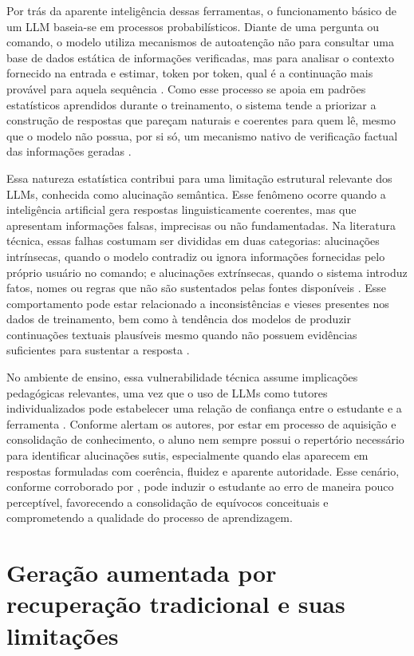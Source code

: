 Por trás da aparente inteligência dessas ferramentas, o funcionamento básico de um LLM baseia-se em processos probabilísticos. Diante de uma pergunta ou comando, o modelo utiliza mecanismos de autoatenção não para consultar uma base de dados estática de informações verificadas, mas para analisar o contexto fornecido na entrada e estimar, token por token, qual é a continuação mais provável para aquela sequência . Como esse processo se apoia em padrões estatísticos aprendidos durante o treinamento, o sistema tende a priorizar a construção de respostas que pareçam naturais e coerentes para quem lê, mesmo que o modelo não possua, por si só, um mecanismo nativo de verificação factual das informações geradas .

Essa natureza estatística contribui para uma limitação estrutural relevante dos LLMs, conhecida como alucinação semântica. Esse fenômeno ocorre quando a inteligência artificial gera respostas linguisticamente coerentes, mas que apresentam informações falsas, imprecisas ou não fundamentadas. Na literatura técnica, essas falhas costumam ser divididas em duas categorias: alucinações intrínsecas, quando o modelo contradiz ou ignora informações fornecidas pelo próprio usuário no comando; e alucinações extrínsecas, quando o sistema introduz fatos, nomes ou regras que não são sustentados pelas fontes disponíveis . Esse comportamento pode estar relacionado a inconsistências e vieses presentes nos dados de treinamento, bem como à tendência dos modelos de produzir continuações textuais plausíveis mesmo quando não possuem evidências suficientes para sustentar a resposta .

No ambiente de ensino, essa vulnerabilidade técnica assume implicações pedagógicas relevantes, uma vez que o uso de LLMs como tutores individualizados pode estabelecer uma relação de confiança entre o estudante e a ferramenta . Conforme alertam os autores, por estar em processo de aquisição e consolidação de conhecimento, o aluno nem sempre possui o repertório necessário para identificar alucinações sutis, especialmente quando elas aparecem em respostas formuladas com coerência, fluidez e aparente autoridade. Esse cenário, conforme corroborado por , pode induzir o estudante ao erro de maneira pouco perceptível, favorecendo a consolidação de equívocos conceituais e comprometendo a qualidade do processo de aprendizagem.

\section{Geração aumentada por recuperação tradicional e suas limitações}
\label{sec:rag_tradicional}

